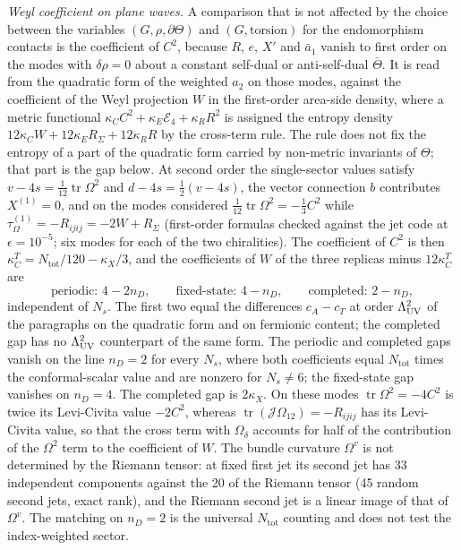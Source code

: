 \emph{Weyl coefficient on plane waves.} A comparison that is not affected by the choice between the variables \((G,\rho,\partial\Theta)\) and \((G,\text{torsion})\) for the endomorphism contacts is the coefficient of \(C^2\), because \(R\), \(e\), \(X'\) and \(\bar a_1\) vanish to first order on the modes with \(\delta\rho=0\) about a constant self-dual or anti-self-dual \(\bar\Theta\). It is read from the quadratic form of the weighted \(a_2\) on those modes, against the coefficient of the Weyl projection \(W\) in the first-order area-side density, where a metric functional \(\kappa_CC^2+\kappa_E\mathcal E_4+\kappa_RR^2\) is assigned the entropy density \(12\kappa_CW+12\kappa_ER_\Sigma+12\kappa_RR\) by the cross-term rule. The rule does not fix the entropy of a part of the quadratic form carried by non-metric invariants of \(\Theta\); that part is the gap below. At second order the single-sector values satisfy \(v-4s=\tfrac1{12}\operatorname{tr}\Omega^2\) and \(d-4s=\tfrac12(v-4s)\), the vector connection \(b\) contributes \(X^{(1)}=0\), and on the modes considered \(\tfrac1{12}\operatorname{tr}\Omega^2=-\tfrac13C^2\) while \(\tau_\Omega^{(1)}=-R_{ijij}=-2W+R_\Sigma\) (first-order formulas checked against the jet code at \(\epsilon=10^{-5}\); six modes for each of the two chiralities). The coefficient of \(C^2\) is then \(\kappa_C^T=N_{\mathrm{tot}}/120-\kappa_X/3\), and the coefficients of \(W\) of the three replicas minus \(12\kappa_C^T\) are
\[
  \text{periodic: }4-2n_D,\qquad \text{fixed-state: }4-n_D,\qquad \text{completed: }2-n_D,
\]
independent of \(N_s\). The first two equal the differences \(c_A-c_T\) at order \(\Lambda_{\mathrm{UV}}^2\) of the paragraphs on the quadratic form and on fermionic content; the completed gap has no \(\Lambda_{\mathrm{UV}}^2\) counterpart of the same form. The periodic and completed gaps vanish on the line \(n_D=2\) for every \(N_s\), where both coefficients equal \(N_{\mathrm{tot}}\) times the conformal-scalar value and are nonzero for \(N_s\neq6\); the fixed-state gap vanishes on \(n_D=4\). The completed gap is \(2\kappa_X\). On these modes \(\operatorname{tr}\Omega^2=-4C^2\) is twice its Levi-Civita value \(-2C^2\), whereas \(\operatorname{tr}(\mathcal J\Omega_{12})=-R_{ijij}\) has its Levi-Civita value, so that the cross term with \(\Omega_\delta\) accounts for half of the contribution of the \(\Omega^2\) term to the coefficient of \(W\). The bundle curvature \(\Omega^v\) is not determined by the Riemann tensor: at fixed first jet its second jet has 33 independent components against the 20 of the Riemann tensor (45 random second jets, exact rank), and the Riemann second jet is a linear image of that of \(\Omega^v\). The matching on \(n_D=2\) is the universal \(N_{\mathrm{tot}}\) counting and does not test the index-weighted sector.

